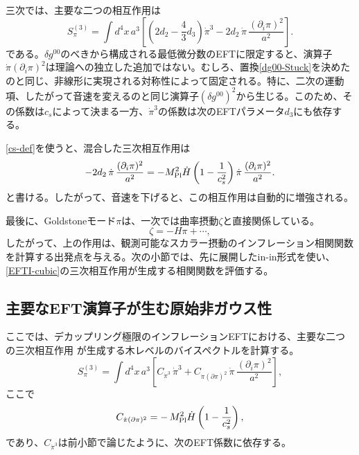 \documentclass[a4paper,11pt,oneside]{article}
\theoremstyle{definition}
\numberwithin{equation}{section}
\begin{document}
三次では、主要な二つの相互作用は
\begin{equation}\label{EFTI-cubic}
S_\pi^{(3)}
=
\int d^4x\,a^3
\left[
\left(2d_2-\frac{4}{3}d_3\right)\dot\pi^3
-2d_2\,\dot\pi\,\frac{(\partial_i\pi)^2}{a^2}
\right] .
\end{equation}
である。\(\delta g^{00}\)のべきから構成される最低微分数のEFTに限定すると、演算子\(\dot\pi(\partial_i\pi)^2\)は理論への独立した追加ではない。むしろ、置換\eqref{dg00-Stuck}を決めたのと同じ、非線形に実現される対称性によって固定される。特に、二次の運動項、したがって音速を変えるのと同じ演算子\((\delta g^{00})^2\)から生じる。このため、その係数は\(c_s\)によって決まる一方、\(\dot\pi^3\)の係数は次のEFTパラメータ\(d_3\)にも依存する。



\eqref{cs-def}を使うと、混合した三次相互作用は
\begin{equation}
-2d_2\,\dot\pi\,\frac{(\partial_i\pi)^2}{a^2}
=
-M_{\rm Pl}^2\dot H
\left(1-\frac{1}{c_s^2}\right)
\dot\pi\,\frac{(\partial_i\pi)^2}{a^2} .
\end{equation}
と書ける。したがって、音速を下げると、この相互作用は自動的に増強される。



最後に、Goldstoneモード\(\pi\)は、一次では曲率摂動\(\zeta\)と直接関係している。
\begin{equation}
\zeta = -H\pi + \cdots ,
\end{equation}
したがって、上の作用は、観測可能なスカラー摂動のインフレーション相関関数を計算する出発点を与える。次の小節では、先に展開したin-in形式を使い、\eqref{EFTI-cubic}の三次相互作用が生成する相関関数を評価する。






\subsection{主要なEFT演算子が生む原始非ガウス性}



ここでは、デカップリング極限のインフレーションEFTにおける、主要な二つの三次相互作用
が生成する木レベルのバイスペクトルを計算する。
\begin{equation}
S_\pi^{(3)}
=
\int d^4x\,a^3
\left[
C_{\dot\pi^3}\,\dot\pi^3
+
C_{\dot\pi(\partial\pi)^2}\,
\dot\pi\,\frac{(\partial_i\pi)^2}{a^2}
\right] ,
\end{equation}
ここで
\begin{equation}
C_{\dot\pi(\partial\pi)^2}
=
-\,M_{\rm Pl}^2\dot H\left(1-\frac{1}{c_s^2}\right) ,
\end{equation}
であり、\(C_{\dot\pi^3}\)は前小節で論じたように、次のEFT係数に依存する。
\end{document}
